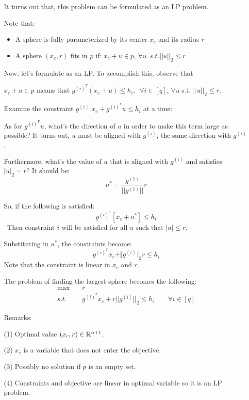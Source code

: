 It turns out that, this problem can be formulated as an LP problem. \

Note that:
\begin{itemize}
	\item A sphere is fully parameterized by its center $x_c$ and its radius $r$
	
	\item A sphere $(x_c, r)$ fits in $p$ if: $x_c + u \in p$, $\forall u \,\,\, s.t. ||u||_2\leq r$
\end{itemize}

\vspace{0.3cm}
Now, let's formulate as an LP. To accomplish this, observe that 

$x_c+u \in p$ means that $g^{(i)^T}(x_c + u) \leq h_i,\,\,\, \forall i\in [q]$, $\forall u$ s.t. $||u||_2\leq r$.

\vspace{0.2cm}
Examine the constraint $g^{({i})^T}x_c + g^{({i})^T}u \leq h_i$ at a time:

As for $g^{({i})^T}u$, what's the direction of $u$ in order to make this term large as possible? It turns out, $u$ must be aligned with $g^{(i)}$, the same direction with $g^{(i)}$.

Furthermore, what's the value of $u$ that is aligned with $g^{(i)}$ and satisfies  $\vert u\vert_2=r?$ It should be:
$$u^*=\frac{g^{(1)}}{||g^{(1)}||}r$$


So, if the following is satisfied:
$$g^{(i)^T}[x_c + u^*] \leq h_i$$\
Then constraint $i$ will be satisfied for all $u$ such that $\vert u\vert \leq r$.

Substituting in $u^*$, the constraints become:
$$g^{(i)^T} x_c + \Vert g^{(i)}\Vert_2 r\leq h_i$$
Note that the constraint is linear in $x_c$ and $r$.

The problem of finding the largest sphere becomes the following:
\begin{align*}
	\max \quad & r\\
	s.t.\quad &g^{(i)^T}x_c + r ||g^{(i)}||_2\leq h_i \qquad \forall i\in [q]
\end{align*}


Remarks:

(1) Optimal value $(x_c, r)\in \mathbb{R}^{n+1}$.

(2) $x_c$ is a variable that does not enter the objective.

(3) Possibly no solution if $p$ is an empty set.

(4) Constraints and objective are linear in optimal variable so it is an LP problem.

